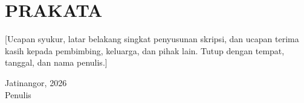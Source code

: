 \chapter*{PRAKATA}

[Ucapan syukur, latar belakang singkat penyusunan skripsi, dan ucapan terima
kasih kepada pembimbing, keluarga, dan pihak lain. Tutup dengan tempat, tanggal,
dan nama penulis.]

\vspace{1cm}
\begin{flushright}
Jatinangor, 2026 \\
Penulis
\end{flushright}
